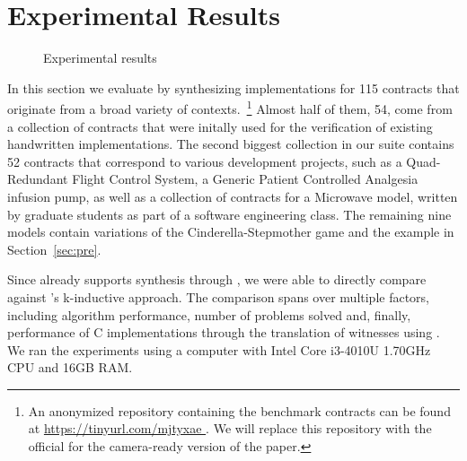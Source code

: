 \section{Experimental Results}
\label{sec:results}

\begin{figure*}[!t]
\centering
{}
\hfil
{}
\hfil
{}
\caption{Experimental results}
\label{fg:results}
\end{figure*}


In this section we evaluate \jsynvg by synthesizing implementations
for 115 contracts that originate from a broad variety of contexts.~\footnote{An
anonymized repository containing the benchmark contracts can be found at
\url{https://tinyurl.com/mjtyxae }. We will replace this repository with the official for the camera-ready
version of the paper.} Almost half of them, 54, come from a collection of contracts that were initally used for the verification of existing handwritten implementations. The second biggest collection in our suite contains 52 contracts that correspond to various development projects, such as a Quad-Redundant Flight Control System, a Generic Patient Controlled Analgesia infusion pump, as well as a collection of contracts
for a Microwave model, written by graduate students as part of a software
engineering class. The remaining nine models contain variations of the
Cinderella-Stepmother game and the example in Section~\ref{sec:pre}.

Since \jkind already supports synthesis through \jsyn, we were able to directly
compare \jsynvg against \jsyn's k-inductive approach.
The comparison spans over multiple factors, including
algorithm performance, number of problems solved and, finally, performance
of C implementations through the translation of witnesses using \smtlibtoc. We
ran the experiments using a computer with Intel Core i3-4010U 1.70GHz CPU and
16GB RAM.


